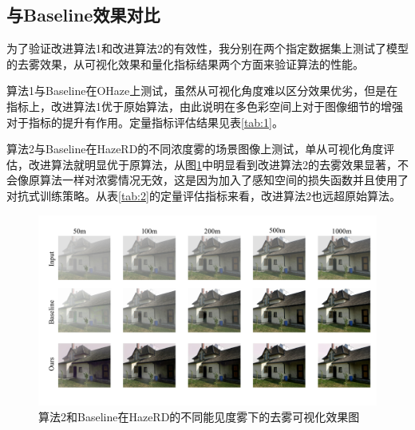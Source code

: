 \documentclass{article}
\begin{document}
\subsection{与Baseline效果对比}

为了验证改进算法1和改进算法2的有效性，我分别在两个指定数据集上测试了模型的去雾效果，从可视化效果和量化指标结果两个方面来验证算法的性能。

\begin{table}[!htb]
  \centering
  \caption{改进算法1与Baseline在OHaze数据集上的定量效果对比。
  Baseline(Paper)表示原论文中的指标，Baseline(Code)表示我复现的指标。}
  \label{tab:1}
  \small %
  \end{table}

算法1与Baseline在OHaze上测试，虽然从可视化角度难以区分效果优劣，但是在指标上，改进算法1优于原始算法，由此说明在多色彩空间上对于图像细节的增强对于指标的提升有作用。定量指标评估结果见表\ref{tab:1}。

算法2与Baseline在HazeRD的不同浓度雾的场景图像上测试，单从可视化角度评估，改进算法就明显优于原算法，从图\ref{fig:fig6}中明显看到改进算法2的去雾效果显著，不会像原算法一样对浓雾情况无效，这是因为加入了感知空间的损失函数并且使用了对抗式训练策略。从表\ref{tab:2}的定量评估指标来看，改进算法2也远超原始算法。

  \begin{figure}[t]
    \centering
    \includegraphics[width=.9\linewidth]{image/fig2.pdf}
    \caption{算法2和Baseline在HazeRD的不同能见度雾下的去雾可视化效果图}
    \label{fig:fig6}
  \end{figure}
\end{document}
